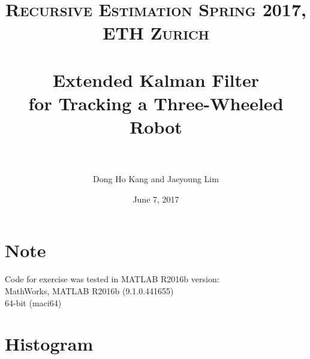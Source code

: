 \documentclass[paper=a4, fontsize=11pt]{scrartcl} %
\title{	
\normalfont \normalsize 
\textsc{Recursive Estimation Spring 2017, ETH Zurich} \\ [25pt] %
\horrule{0.5pt} \\[0.4cm] %
\huge Extended Kalman Filter \\ for Tracking a Three-Wheeled Robot \\ %
\horrule{2pt} \\[0.5cm] %
}
\author{Dong Ho Kang and Jaeyoung Lim} %
\date{\normalsize June 7, 2017} %
\numberwithin{equation}{section} %
\numberwithin{figure}{section} %
\numberwithin{table}{section} %
\begin{document}
\maketitle %


\graphicspath{{figures/}} 

\section*{Note}

\begin{center}
Code for exercise was tested in MATLAB R2016b version: \\
\vspace{3mm}
MathWorks, MATLAB R2016b (9.1.0.441655) \\
64-bit (maci64) 
\end{center}

\vspace{5mm}

\section*{Histogram}
\end{document}
